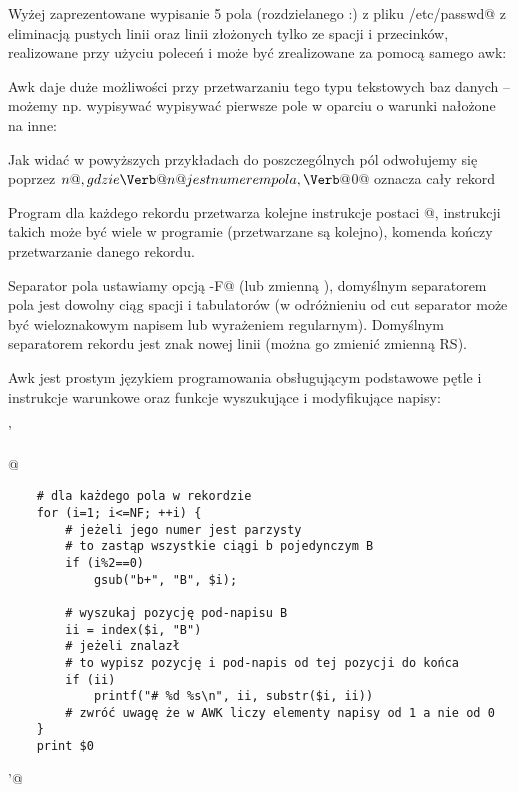\documentclass{pdfBooklets}
\begin{document}
Wyżej zaprezentowane wypisanie 5 pola (rozdzielanego :) z pliku \Verb@/etc/passwd@  z eliminacją pustych linii oraz
linii złożonych tylko ze spacji i przecinków, realizowane przy użyciu poleceń \Verb@cut@ i \Verb@grep@
może być zrealizowane za pomocą samego awk:

Awk daje duże możliwości przy przetwarzaniu tego typu tekstowych baz danych -- możemy np.
wypisywać wypisywać pierwsze pole w oparciu o warunki nałożone na inne:

Jak widać w powyższych przykładach do poszczególnych pól odwołujemy się poprzez \Verb@$n@,
gdzie \Verb@n@ jest numerem pola, \Verb@$0@ oznacza cały rekord

Program dla każdego rekordu przetwarza kolejne instrukcje postaci @,
instrukcji takich może być wiele w programie (przetwarzane są kolejno),
komenda \Verb@next@ kończy przetwarzanie danego rekordu.

Separator pola ustawiamy opcją \Verb@-F@ (lub zmienną \Verb@FS@),
domyślnym separatorem pola jest dowolny ciąg spacji i tabulatorów
(w odróżnieniu od cut separator może być wieloznakowym napisem lub wyrażeniem regularnym).
Domyślnym separatorem rekordu jest znak nowej linii (można go zmienić zmienną RS).

Awk jest prostym językiem programowania obsługującym podstawowe pętle i instrukcje warunkowe
oraz funkcje wyszukujące i modyfikujące napisy:

\begin{oframed}\noindent{}\Verb@ '{@\vspace{-0.95em}
\begin{verbatim}
	# dla każdego pola w rekordzie
	for (i=1; i<=NF; ++i) {
		# jeżeli jego numer jest parzysty
		# to zastąp wszystkie ciągi b pojedynczym B
		if (i%2==0)
			gsub("b+", "B", $i);
		
		# wyszukaj pozycję pod-napisu B
		ii = index($i, "B")
		# jeżeli znalazł
		# to wypisz pozycję i pod-napis od tej pozycji do końca
		if (ii)
			printf("# %d %s\n", ii, substr($i, ii))
		# zwróć uwagę że w AWK liczy elementy napisy od 1 a nie od 0
	}
	print $0
\end{verbatim}
\vspace{-0.95em}\Verb@}'@\end{oframed}
\end{document}
